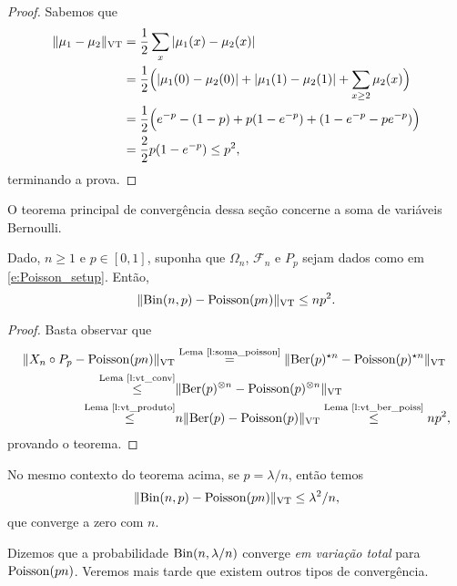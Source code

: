 \begin{topics}
\begin{proof}
Sabemos que
\begin{equation}
  \begin{split}
    \lVert \mu_1 - \mu_2 \rVert_{\operatorname{VT}} & = \frac{1}{2} \sum_{x} |\mu_1(x) - \mu_2(x)|\\
    & = \frac{1}{2} \Big( |\mu_1(0) - \mu_2(0)| + |\mu_1(1) - \mu_2(1)| + \sum_{x \geq 2} \mu_2(x) \Big)\\
    & = \frac{1}{2} \Big( e^{-p} - (1-p) + p(1-e^{-p}) + (1 - e^{-p} - p e^{-p}) \Big)\\
    & = \frac{2}{2} p (1 - e^{-p}) \leq p^2,
  \end{split}
\end{equation}
terminando a prova.
\end{proof}

O teorema principal de convergência dessa seção concerne a soma de variáveis Bernoulli.

\begin{theorem}
  \label{t:lei_peq_numeros}
  Dado, $n \geq 1$ e $p \in [0,1]$, suponha que $\Omega_n$, $\mathcal{F}_n$ e $P_p$ sejam dados como em \eqref{e:Poisson_setup}.
  Então,
  \begin{equation}
    \lVert \operatorname{Bin}(n,p) - \operatorname{Poisson}(pn) \rVert_{\operatorname{VT}} \leq n p^2.
  \end{equation}
\end{theorem}

\begin{proof}
  Basta observar que
  \begin{equation}
    \begin{split}
      \lVert X_n \circ P_p - \operatorname{Poisson}(pn) \rVert_{\operatorname{VT}} & \overset{\text{Lema~\ref{l:soma_poisson}}}= \lVert \operatorname{Ber}(p)^{\star n} - \operatorname{Poisson}(p)^{\star n} \rVert_{\operatorname{VT}}\\
      \overset{\text{Lema~\ref{l:vt_conv}}}\leq & \lVert \operatorname{Ber}(p)^{\otimes n} - \operatorname{Poisson}(p)^{\otimes n} \rVert_{\operatorname{VT}}\\
      \overset{\text{Lema~\ref{l:vt_produto}}}\leq & n \lVert \operatorname{Ber}(p) - \operatorname{Poisson}(p) \rVert_{\operatorname{VT}} \overset{\text{Lema~\ref{l:vt_ber_poiss}}}\leq n p^2,
    \end{split}
  \end{equation}
  provando o teorema.
\end{proof}

\begin{corollary}
  No mesmo contexto do teorema acima, se $p = \lambda/n$, então temos
  \begin{equation}
    \lVert \operatorname{Bin}(n,p) - \operatorname{Poisson}(pn) \rVert_{\operatorname{VT}} \leq \lambda^2 / n,
  \end{equation}
  que converge a zero com $n$.
\end{corollary}
Dizemos que a probabilidade $\operatorname{Bin}(n,\lambda/n)$ converge \textsl{em variação total} para $\operatorname{Poisson}(pn)$.
Veremos mais tarde que existem outros tipos de convergência.



\end{topics}
